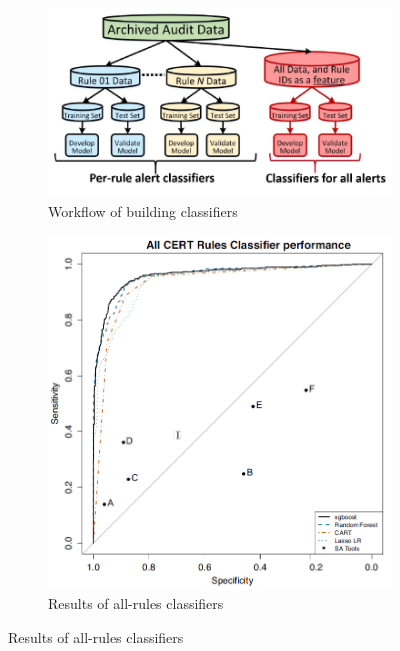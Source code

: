  \begin{figure}[H]
     \begin{subfigure}{.5\textwidth}
         \centering
         \includegraphics[scale=0.3]{./src/multiple_classifiers_workflow.png}
         \caption{Workflow of building classifiers}\label{multiple_classifiers:workflow}
     \end{subfigure}%
     \begin{subfigure}{.5\textwidth}
         \centering
         \includegraphics[scale=0.3]{./src/multiple_classifiers_resulst.png}
         \caption{Results of all-rules classifiers}\label{multiple_classifiers:results}
     \end{subfigure}
 \end{figure}


